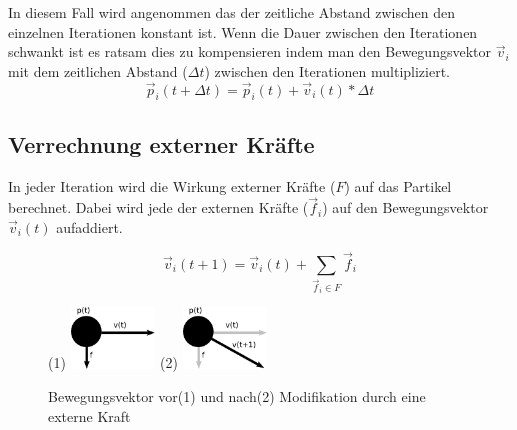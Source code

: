 \begin{Spacing}{\mylinespace}
		In diesem Fall wird angenommen das der zeitliche Abstand zwischen den
		einzelnen Iterationen konstant ist. Wenn die Dauer zwischen den Iterationen
		schwankt ist es ratsam dies zu kompensieren indem man den Bewegungsvektor
		$\vec{v}_{i}$ mit dem zeitlichen Abstand ($\Delta t$) zwischen den
		Iterationen multipliziert.
		 \[ \vec{p}_{i}(t+\Delta t) = \vec{p}_{i}(t) + \vec{v}_{i}(t) * \Delta t\]

    \subsection{Verrechnung externer Kräfte}
        In jeder Iteration wird die Wirkung externer Kräfte ($F$) auf das
        Partikel berechnet. Dabei wird jede der externen Kräfte ($\vec{f}_i$) auf den
        Bewegungsvektor $\vec{v}_{i}(t)$ aufaddiert.

        \[ \vec{v}_{i}(t+1) = \vec{v}_{i}(t) + \sum_{\vec{f}_{i} \in F}{\vec{f}_{i}} \]

		\begin{figure}[h!]
			\centering
			\subfigure(1){ \includegraphics[width=0.2\textwidth]{graphics/Phys_bew1.png} \label{fig:ModForce1} }
			\subfigure(2){ \includegraphics[width=0.2\textwidth]{graphics/Phys_bew2.png} \label{fig:ModForce2} }
			\caption{Bewegungsvektor vor(1) und nach(2) Modifikation durch eine externe Kraft }
			\label{fig:ModForce}
		\end{figure}


\end{Spacing}
